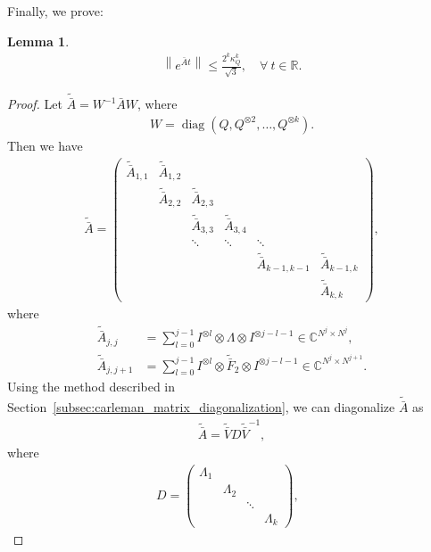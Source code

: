 \documentclass[superscriptaddress,onecolumn,nofootinbib,longbibliography,a4paper,accepted=2026-09-29]{quantumarticle}
\theoremstyle{plain}
\newtheorem{lemma}[thm]{Lemma}
\theoremstyle{definition}
\numberwithin{thm}{section}
\numberwithin{assumption}{section}
\numberwithin{lemma}{section}
\numberwithin{prop}{section}
\numberwithin{cor}{section}
\numberwithin{definition}{section}
\numberwithin{rmk}{section}
\numberwithin{equation}{section}
\newcommand{\norm}[1]     {\left\| #1 \right\|}
\newcommand{\R}{\mathbb{R}}
\newcommand{\myC}{\mathbb{C}}
\newcommand{\lrb}[1]{\left ( #1 \right )}
\newcommand{\diag}[1]{\operatorname{diag}\lrb{#1}}
\begin{document}
Finally, we prove:
\begin{lemma}
\begin{align}
\norm{e^{\bar{A}t}}\le \frac{2^k \kappa_Q^{k}}{\sqrt{3}},\quad \forall~t \in \R.     
\label{eq:bound_exp_At}
\end{align}    
\label{lem:bound_exp_At}
\end{lemma}
\begin{proof}
    Let $\tilde{\bar{A}}=W^{-1}\bar{A}W$, 
where
\begin{align}
W = \diag{Q, Q^{\otimes 2}, \dots, Q^{\otimes k}}.
\end{align}
Then we have
\begin{align}
    \tilde{\bar{A}}=
    \begin{pmatrix}
    \tilde{\bar{A}}_{1,1} & \tilde{\bar{A}}_{1,2} & & & &\\
     & \tilde{\bar{A}}_{2,2} & \tilde{\bar{A}}_{2,3} & & &\\
            &  & \tilde{\bar{A}}_{3,3} & \tilde{\bar{A}}_{3,4} &       & \\
            &         & \ddots   & \ddots   & \ddots & \\
            &         &         &  & \tilde{\bar{A}}_{k-1,k-1}  & \tilde{\bar{A}}_{k-1,k}\\      
            &         &         &         &   & \tilde{\bar{A}}_{k,k}
    \end{pmatrix},
\end{align}
where
\begin{align}
\tilde{\bar{A}}_{j,j}&=\sum_{l=0}^{j-1} I^{\otimes l} \otimes \Lambda \otimes I^{\otimes j-l-1} \in \myC^{N^j\times N^j}, \\    
\tilde{\bar{A}}_{j,j+1}&=\sum_{l=0}^{j-1} I^{\otimes l} \otimes \tilde{\bar{F}}_2 \otimes I^{\otimes j-l-1} \in \myC^{N^{j}\times N^{j+1}}.
\end{align}
Using the method described in Section~\ref{subsec:carleman_matrix_diagonalization}, we can diagonalize $\tilde{\bar{A}}$ as 
\begin{align}
    \tilde{\bar{A}}=\tilde{\bar{V}} D \tilde{\bar{V}}^{-1},
\end{align}
where
\begin{align}
D=\begin{pmatrix}
        \Lambda_1  &           &        & \\
                 & \Lambda_2 &        & \\
                 &           & \ddots & \\
                 &           &      &\Lambda_k \end{pmatrix},~~~

\end{align}
\end{proof}
\end{document}

